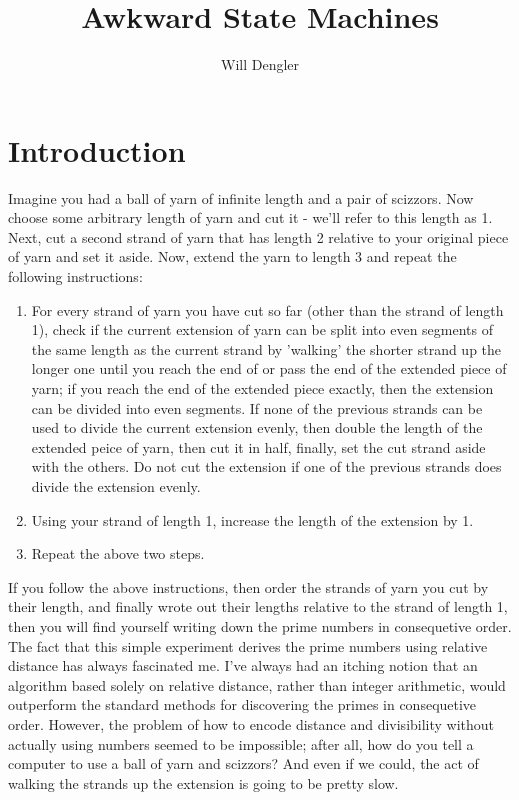 \documentclass[a4paper,12pt]{article}
\begin{document}
\title{Awkward State Machines}
\author{Will Dengler}
\maketitle

\section{Introduction}
Imagine you had a ball of yarn of infinite length and a pair of scizzors. Now choose some arbitrary length of yarn and cut it - we'll refer to this length as 1. Next, cut a second strand of yarn that has length 2 relative to your original piece of yarn and set it aside. Now, extend the yarn to length 3 and repeat the following instructions:
\begin{enumerate}
\item For every strand of yarn you have cut so far (other than the strand of length 1), check if the current extension of yarn can be split into even segments of the same length as the current strand by 'walking' the shorter strand up the longer one until you reach the end of or pass the end of the extended piece of yarn; if you reach the end of the extended piece exactly, then the extension can be divided into even segments. If none of the previous strands can be used to divide the current extension evenly, then double the length of the extended peice of yarn, then cut it in half, finally, set the cut strand aside with the others. Do not cut the extension if one of the previous strands does divide the extension evenly.
\item Using your strand of length 1, increase the length of the extension by 1.
\item Repeat the above two steps.
\end{enumerate} 

If you follow the above instructions, then order the strands of yarn you cut by their length, and finally wrote out their lengths relative to the strand of length 1, then you will find yourself writing down the prime numbers in consequetive order. The fact that this simple experiment derives the prime numbers using relative distance has always fascinated me. I've always had an itching notion that an algorithm based solely on relative distance, rather than integer arithmetic, would outperform the standard methods for discovering the primes in consequetive order. However, the problem of how to encode distance and divisibility without actually using numbers seemed to be impossible; after all, how do you tell a computer to use a ball of yarn and scizzors? And even if we could, the act of walking the strands up the extension is going to be pretty slow. 
\end{document}
